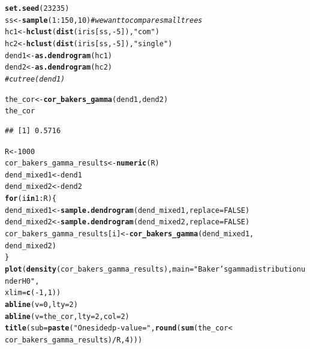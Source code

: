 \documentclass[shortnames,nojss,article]{jss}\usepackage[]{graphicx}\usepackage[]{color}
\makeatletter
\newcommand{\hlnum}[1]{\textcolor[rgb]{0.686,0.059,0.569}{#1}}%
\newcommand{\hlstr}[1]{\textcolor[rgb]{0.192,0.494,0.8}{#1}}%
\newcommand{\hlcom}[1]{\textcolor[rgb]{0.678,0.584,0.686}{\textit{#1}}}%
\newcommand{\hlopt}[1]{\textcolor[rgb]{0,0,0}{#1}}%
\newcommand{\hlstd}[1]{\textcolor[rgb]{0.345,0.345,0.345}{#1}}%
\newcommand{\hlkwa}[1]{\textcolor[rgb]{0.161,0.373,0.58}{\textbf{#1}}}%
\newcommand{\hlkwb}[1]{\textcolor[rgb]{0.69,0.353,0.396}{#1}}%
\newcommand{\hlkwc}[1]{\textcolor[rgb]{0.333,0.667,0.333}{#1}}%
\newcommand{\hlkwd}[1]{\textcolor[rgb]{0.737,0.353,0.396}{\textbf{#1}}}%
\newenvironment{kframe}{%
 \def\at@end@of@kframe{}%
 \ifinner\ifhmode%
  \def\at@end@of@kframe{\end{minipage}}%
  \begin{minipage}{\columnwidth}%
 \fi\fi%
 \def\FrameCommand##1{\hskip\@totalleftmargin \hskip-\fboxsep
 \colorbox{shadecolor}{##1}\hskip-\fboxsep
     \hskip-\linewidth \hskip-\@totalleftmargin \hskip\columnwidth}%
 \MakeFramed {\advance\hsize-\width
   \@totalleftmargin\z@ \linewidth\hsize
   \@setminipage}}%
 {\par\unskip\endMakeFramed%
 \at@end@of@kframe}
\newenvironment{knitrout}{}{} %
\makeatother
\begin{document}
\begin{knitrout}
\color{fgcolor}\begin{kframe}
\begin{alltt}
\hlkwd{set.seed}\hlstd{(}\hlnum{23235}\hlstd{)}
\hlstd{ss} \hlkwb{<-} \hlkwd{sample}\hlstd{(}\hlnum{1}\hlopt{:}\hlnum{150}\hlstd{,} \hlnum{10}\hlstd{)}  \hlcom{# we want to compare small trees}
\hlstd{hc1} \hlkwb{<-} \hlkwd{hclust}\hlstd{(}\hlkwd{dist}\hlstd{(iris[ss,} \hlopt{-}\hlnum{5}\hlstd{]),} \hlstr{"com"}\hlstd{)}
\hlstd{hc2} \hlkwb{<-} \hlkwd{hclust}\hlstd{(}\hlkwd{dist}\hlstd{(iris[ss,} \hlopt{-}\hlnum{5}\hlstd{]),} \hlstr{"single"}\hlstd{)}
\hlstd{dend1} \hlkwb{<-} \hlkwd{as.dendrogram}\hlstd{(hc1)}
\hlstd{dend2} \hlkwb{<-} \hlkwd{as.dendrogram}\hlstd{(hc2)}
\hlcom{# cutree(dend1)}

\hlstd{the_cor} \hlkwb{<-} \hlkwd{cor_bakers_gamma}\hlstd{(dend1, dend2)}
\hlstd{the_cor}
\end{alltt}
\begin{verbatim}
## [1] 0.5716
\end{verbatim}
\begin{alltt}
\hlstd{R} \hlkwb{<-} \hlnum{1000}
\hlstd{cor_bakers_gamma_results} \hlkwb{<-} \hlkwd{numeric}\hlstd{(R)}
\hlstd{dend_mixed1} \hlkwb{<-} \hlstd{dend1}
\hlstd{dend_mixed2} \hlkwb{<-} \hlstd{dend2}
\hlkwa{for} \hlstd{(i} \hlkwa{in} \hlnum{1}\hlopt{:}\hlstd{R) \{}
    \hlstd{dend_mixed1} \hlkwb{<-} \hlkwd{sample.dendrogram}\hlstd{(dend_mixed1,} \hlkwc{replace} \hlstd{=} \hlnum{FALSE}\hlstd{)}
    \hlstd{dend_mixed2} \hlkwb{<-} \hlkwd{sample.dendrogram}\hlstd{(dend_mixed2,} \hlkwc{replace} \hlstd{=} \hlnum{FALSE}\hlstd{)}
    \hlstd{cor_bakers_gamma_results[i]} \hlkwb{<-} \hlkwd{cor_bakers_gamma}\hlstd{(dend_mixed1,}
        \hlstd{dend_mixed2)}
\hlstd{\}}
\hlkwd{plot}\hlstd{(}\hlkwd{density}\hlstd{(cor_bakers_gamma_results),} \hlkwc{main} \hlstd{=} \hlstr{"Baker's gamma distribution under H0"}\hlstd{,}
    \hlkwc{xlim} \hlstd{=} \hlkwd{c}\hlstd{(}\hlopt{-}\hlnum{1}\hlstd{,} \hlnum{1}\hlstd{))}
\hlkwd{abline}\hlstd{(}\hlkwc{v} \hlstd{=} \hlnum{0}\hlstd{,} \hlkwc{lty} \hlstd{=} \hlnum{2}\hlstd{)}
\hlkwd{abline}\hlstd{(}\hlkwc{v} \hlstd{= the_cor,} \hlkwc{lty} \hlstd{=} \hlnum{2}\hlstd{,} \hlkwc{col} \hlstd{=} \hlnum{2}\hlstd{)}
\hlkwd{title}\hlstd{(}\hlkwc{sub} \hlstd{=} \hlkwd{paste}\hlstd{(}\hlstr{"One sided p-value ="}\hlstd{,} \hlkwd{round}\hlstd{(}\hlkwd{sum}\hlstd{(the_cor} \hlopt{<}
    \hlstd{cor_bakers_gamma_results)}\hlopt{/}\hlstd{R,} \hlnum{4}\hlstd{)))}
\end{alltt}
\end{kframe}


\end{knitrout}
\end{document}

